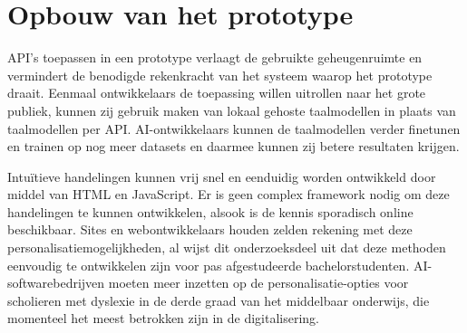 \section{Opbouw van het prototype}

API's toepassen in een prototype verlaagt de gebruikte geheugenruimte en vermindert de benodigde rekenkracht van het systeem waarop het prototype draait. Eenmaal ontwikkelaars de toepassing willen uitrollen naar het grote publiek, kunnen zij gebruik maken van lokaal gehoste taalmodellen in plaats van taalmodellen per API. AI-ontwikkelaars kunnen de taalmodellen verder finetunen en trainen op nog meer datasets en daarmee kunnen zij betere resultaten krijgen.

Intuïtieve handelingen kunnen vrij snel en eenduidig worden ontwikkeld door middel van HTML en JavaScript. Er is geen complex framework nodig om deze handelingen te kunnen ontwikkelen, alsook is de kennis sporadisch online beschikbaar. Sites en webontwikkelaars houden zelden rekening met deze personalisatiemogelijkheden, al wijst dit onderzoeksdeel uit dat deze methoden eenvoudig te ontwikkelen zijn voor pas afgestudeerde bachelorstudenten. AI-softwarebedrijven moeten meer inzetten op de personalisatie-opties voor scholieren met dyslexie in de derde graad van het middelbaar onderwijs, die momenteel het meest betrokken zijn in de digitalisering.
